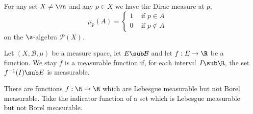 \begin{eg}
  For any set $X \ne \vn$ and any $p \in X$ we have the Dirac measure at $p$,
  $$ \mu_p(A) = \begin{cases}
    1 & \text{ if } p \in A\\
    0 & \text{ if } p \notin A
  \end{cases} $$
  on the $\s$-algebra $\mathcal{P}(X)$.
\end{eg}

\begin{ndefi}
  Let $(X, \mathcal{B}, \mu)$ be a measure space, let $E \sub \mathcal{B}$ and let $f: E \to \R$ be a function. We stay $f$ is a measurable function if, for each interval $I \sub \R$, the set $f^{-1}(I) \sub E$ is measurable.
\end{ndefi}

\begin{remark}
 There are functions $f : \R \to \R$ which are Lebesgue measurable but not Borel measurable. Take the indicator function of a set which is Lebesgue measurable but not Borel measurable. 
\end{remark}